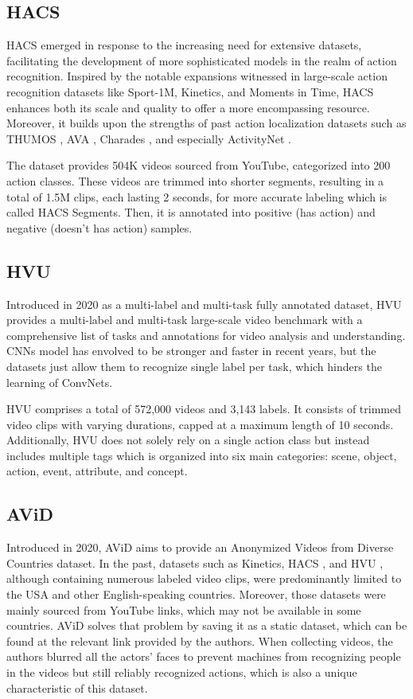 \documentclass[a4paper]{article}
\begin{document}
\subsection{HACS}
HACS \cite{HACS} emerged in response to the increasing need for extensive datasets, facilitating the development of more sophisticated models in the realm of action recognition. Inspired by the notable expansions witnessed in large-scale action recognition datasets like Sport-1M, Kinetics, and Moments in Time, HACS enhances both its scale and quality to offer a more encompassing resource. Moreover, it builds upon the strengths of past action localization datasets such as THUMOS \cite{THUMOS}, AVA \cite{AVA}, Charades \cite{Charades}, and especially ActivityNet \cite{ActivityNet}. 

The dataset provides 504K videos sourced from YouTube, categorized into 200 action classes. These videos are trimmed into shorter segments, resulting in a total of 1.5M clips, each lasting 2 seconds, for more accurate labeling which is called HACS Segments. Then, it is annotated into positive (has action) and negative (doesn't has action) samples.
\subsection{HVU}
Introduced in 2020 as a multi-label and multi-task fully annotated dataset, HVU \cite{HVU} provides a multi-label and multi-task large-scale video benchmark with a comprehensive list of tasks and annotations for video analysis and understanding. CNNs model has envolved to be stronger and faster in recent years, but the datasets just allow them to recognize single label per task, which hinders the learning of ConvNets. 

HVU comprises a total of 572,000 videos and 3,143 labels. It consists of trimmed video clips with varying durations, capped at a maximum length of 10 seconds. Additionally, HVU does not solely rely on a single action class but instead includes multiple tags which is organized into six main categories: scene, object, action, event, attribute, and concept.
\subsection{AViD}
Introduced in 2020, AViD \cite{AViD} aims to provide an Anonymized Videos from Diverse Countries dataset. In the past, datasets such as Kinetics, HACS \cite{HACS}, and HVU \cite{HVU}, although containing numerous labeled video clips, were predominantly limited to the USA and other English-speaking countries. Moreover, those datasets were mainly sourced from YouTube links, which may not be available in some countries. AViD solves that problem by saving it as a static dataset, which can be found at the relevant link provided by the authors. When collecting videos, the authors blurred all the actors' faces to prevent machines from recognizing people in the videos but still reliably recognized actions, which is also a unique characteristic of this dataset.
\end{document}

